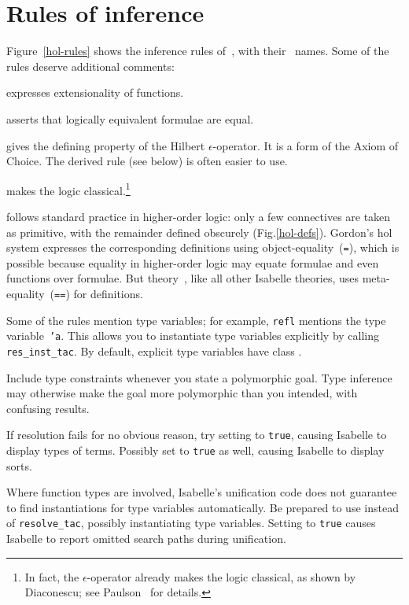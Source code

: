 \section{Rules of inference}
Figure~\ref{hol-rules} shows the inference rules of~\HOL{}, with
their~{\ML} names.  Some of the rules deserve additional comments:
\begin{ttdescription}
\item[\tdx{ext}] expresses extensionality of functions.
\item[\tdx{iff}] asserts that logically equivalent formulae are
  equal.
\item[\tdx{selectI}] gives the defining property of the Hilbert
  $\epsilon$-operator.  It is a form of the Axiom of Choice.  The derived rule
   (see below) is often easier to use.
\item[\tdx{True_or_False}] makes the logic classical.\footnote{In
    fact, the $\epsilon$-operator already makes the logic classical, as
    shown by Diaconescu; see Paulson~\cite{paulson-COLOG} for details.}
\end{ttdescription}

\HOL{} follows standard practice in higher-order logic: only a few
connectives are taken as primitive, with the remainder defined obscurely
(Fig.\ts\ref{hol-defs}).  Gordon's {\sc hol} system expresses the
corresponding definitions \cite[page~270]{mgordon-hol} using
object-equality~({\tt=}), which is possible because equality in
higher-order logic may equate formulae and even functions over formulae.
But theory~\HOL{}, like all other Isabelle theories, uses
meta-equality~({\tt==}) for definitions.

Some of the rules mention type variables; for
example, {\tt refl} mentions the type variable~{\tt'a}.  This allows you to
instantiate type variables explicitly by calling {\tt res_inst_tac}.  By
default, explicit type variables have class .

Include type constraints whenever you state a polymorphic goal.  Type
inference may otherwise make the goal more polymorphic than you intended,
with confusing results.

\begin{warn}
  If resolution fails for no obvious reason, try setting
   to {\tt true}, causing Isabelle to display types of
  terms.  Possibly set  to {\tt true} as well, causing
  Isabelle to display sorts.

  Where function types are involved, Isabelle's unification code does not
  guarantee to find instantiations for type variables automatically.  Be
  prepared to use  instead of {\tt resolve_tac},
  possibly instantiating type variables.  Setting
   to {\tt true} causes Isabelle to report
  omitted search paths during unification.
\end{warn}



